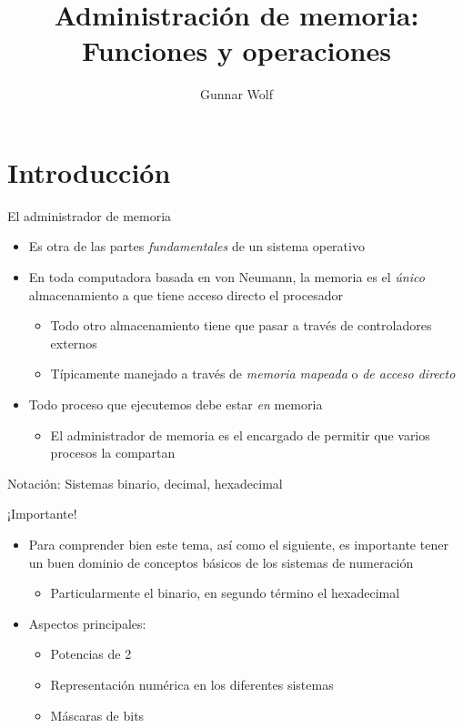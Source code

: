 \documentclass[presentation]{beamer}
\author{Gunnar Wolf}
\date{}
\title{Administración de memoria: Funciones y operaciones}
\begin{document}
\maketitle

\section{Introducción}
\label{sec:orga6053c4}
\begin{frame}[label={sec:orgef7bf50}]{El administrador de memoria}
\begin{itemize}
\item Es otra de las partes \emph{fundamentales} de un sistema operativo
\item En toda computadora basada en von Neumann, la memoria es el \emph{único}
almacenamiento a que tiene acceso directo el procesador
\begin{itemize}
\item Todo otro almacenamiento tiene que pasar a través de controladores externos
\item Típicamente manejado a través de \emph{memoria mapeada} o \emph{de acceso directo}
\end{itemize}
\item Todo proceso que ejecutemos debe estar \emph{en} memoria
\begin{itemize}
\item El administrador de memoria es el encargado de permitir que varios
procesos la compartan
\end{itemize}
\end{itemize}
\end{frame}

\begin{frame}[label={sec:org3b087da}]{Notación: Sistemas binario, decimal, hexadecimal}
\begin{center}
¡Importante!
\end{center}
\begin{itemize}
\item Para comprender bien este tema, así como el siguiente, es importante
tener un buen dominio de conceptos básicos de los sistemas de numeración
\begin{itemize}
\item Particularmente el binario, en segundo término el hexadecimal
\end{itemize}
\item Aspectos principales:
\begin{itemize}
\item Potencias de 2
\item Representación numérica en los diferentes sistemas
\item Máscaras de bits
\end{itemize}
\end{itemize}
\end{frame}
\end{document}
